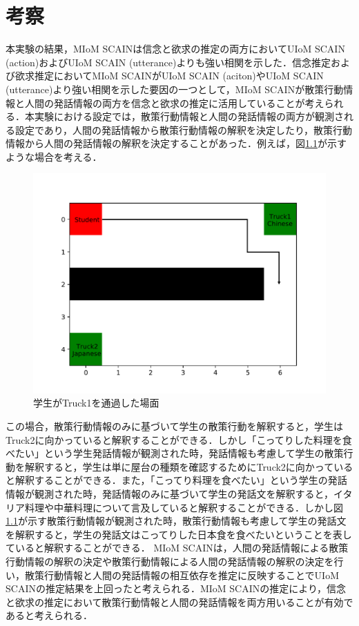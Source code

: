 \chapter{考察}
\par
本実験の結果，MIoM SCAINは信念と欲求の推定の両方においてUIoM SCAIN (action)およびUIoM SCAIN (utterance)よりも強い相関を示した．信念推定および欲求推定においてMIoM SCAINがUIoM SCAIN (aciton)やUIoM SCAIN (utterance)より強い相関を示した要因の一つとして，MIoM SCAINが散策行動情報と人間の発話情報の両方を信念と欲求の推定に活用していることが考えられる．本実験における設定では，散策行動情報と人間の発話情報の両方が観測される設定であり，人間の発話情報から散策行動情報の解釈を決定したり，散策行動情報から人間の発話情報の解釈を決定することがあった．例えば，図\ref{fig:ex_env2}が示すような場合を考える．
\begin{figure}[htbp]
  \begin{center}
    \includegraphics[scale=0.48]{./ex_env2.pdf}
    \caption{学生がTruck1を通過した場面}
    \label{fig:ex_env2}
  \end{center}
\end{figure}
この場合，散策行動情報のみに基づいて学生の散策行動を解釈すると，学生はTruck2に向かっていると解釈することができる．しかし「こってりした料理を食べたい」という学生発話情報が観測された時，発話情報も考慮して学生の散策行動を解釈すると，学生は単に屋台の種類を確認するためにTruck2に向かっていると解釈することができる．また，「こってり料理を食べたい」という学生の発話情報が観測された時，発話情報のみに基づいて学生の発話文を解釈すると，イタリア料理や中華料理について言及していると解釈することができる．しかし図\ref{fig:ex_env2}が示す散策行動情報が観測された時，散策行動情報も考慮して学生の発話文を解釈すると，学生の発話文はこってりした日本食を食べたいということを表していると解釈することができる．
MIoM SCAINは，人間の発話情報による散策行動情報の解釈の決定や散策行動情報による人間の発話情報の解釈の決定を行い，散策行動情報と人間の発話情報の相互依存を推定に反映することでUIoM SCAINの推定結果を上回ったと考えられる．MIoM SCAINの推定により，信念と欲求の推定において散策行動情報と人間の発話情報を両方用いることが有効であると考えられる．

